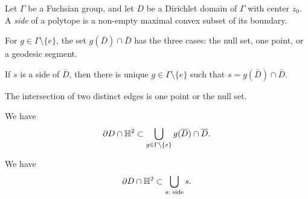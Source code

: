 \documentclass[a4paper]{article}
\begin{document}
\iffalse
\begin{prb}
Let $\Gamma$ be a Fuchsian group, and let $D$ be a Dirichlet domain of $\Gamma$ with center $z_0$.
A \emph{side} of a polytope is a non-empty maximal convex subset of its boundary.
\begin{parts}
\item For $g\in\Gamma\setminus\{e\}$, the set $g(\bar D)\cap\bar D$ has the three cases: the null set, one point, or a geodesic segment.
\item If $s$ is a side of $\bar D$, then there is unique $g\in\Gamma\setminus\{e\}$ such that $s=g(\bar D)\cap\bar D$.
\item The intersection of two distinct edges is one point or the null set.
\item We have
\[\partial D\cap\mathbb{H}^2\subset\bigcup_{g\in\Gamma\setminus\{e\}}g(\overline D)\cap\overline D.\]
\item We have
\[\partial D\cap\mathbb{H}^2\subset\bigcup_{s:\text{ side}}s.\]
\end{parts}
\end{prb}
\end{document}
